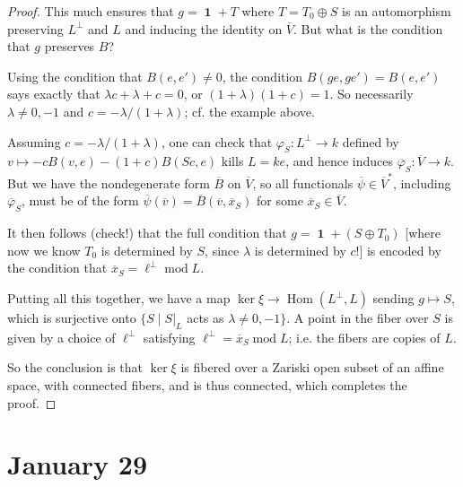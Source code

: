 \documentclass[10pt]{article}
\renewcommand{\phi}{\varphi}
\newcommand{\Hom}{\operatorname{Hom}}
\renewcommand{\(}{\left(}
\renewcommand{\)}{\right)}
\renewcommand{\bar}{\overline}
\DeclareMathOperator{\id}{\mathbf{1}}
\renewcommand{\mod}{\operatorname{mod}}
\numberwithin{thm}{subsection}
\begin{document}
\begin{proof}
This much ensures that $g=\id+T$
where $T=T_0\oplus S$
is an automorphism preserving $L^\perp$ and $L$ and inducing the identity
on $\bar V$. But what is the condition that $g$ preserves $B$?

Using the condition that $B(e,e')\neq 0$,
the condition $B(ge,ge')=B(e,e')$
says exactly that $\lambda c + \lambda + c = 0$,
or $(1+\lambda)(1+c)=1$.
So necessarily $\lambda\neq 0,-1$
and $c=-\lambda/(1+\lambda)$; cf. the example above.

Assuming $c=-\lambda/(1+\lambda)$,
one can check that $\phi_S:L^\perp\to k$
defined by $v\mapsto -cB(v,e)-(1+c)B(Sc,e)$
kills $L=ke$, and hence induces $\bar \phi_S:\bar V\to k$.
But we have the nondegenerate form $\bar B$ on $\bar V$,
so all functionals $\bar\psi\in \bar V^*$, including $\bar \phi_S$,
must be of the form $\bar \psi(\bar v)=\bar B(\bar v, \bar x_S)$
for some $\bar x_S\in \bar V$.

It then follows (check!) that the full condition that $g=\id+(S\oplus T_0)$
[where now we know $T_0$ is determined by $S$, since $\lambda$ is determined by $c$!]
is encoded by the condition that $\bar x_S=\ell^\perp\mod L$.

Putting all this together, we have a map
$\ker\xi\to \Hom(L^\perp,L)$
sending $g\mapsto S$,
which is surjective onto $\{S\mid S|_L$ acts as $\lambda\neq 0,-1\}$.
A point in the fiber over $S$
is given by a choice of $\ell^\perp$ satisfying $\ell^\perp=\bar x_S\mod L$;
i.e. the fibers are copies of $L$.

So the conclusion is that $\ker\xi$ is fibered over a Zariski open subset of an affine space, with connected fibers, and is thus connected,
which completes the proof.
\end{proof}
\section{January 29}
\end{document}
